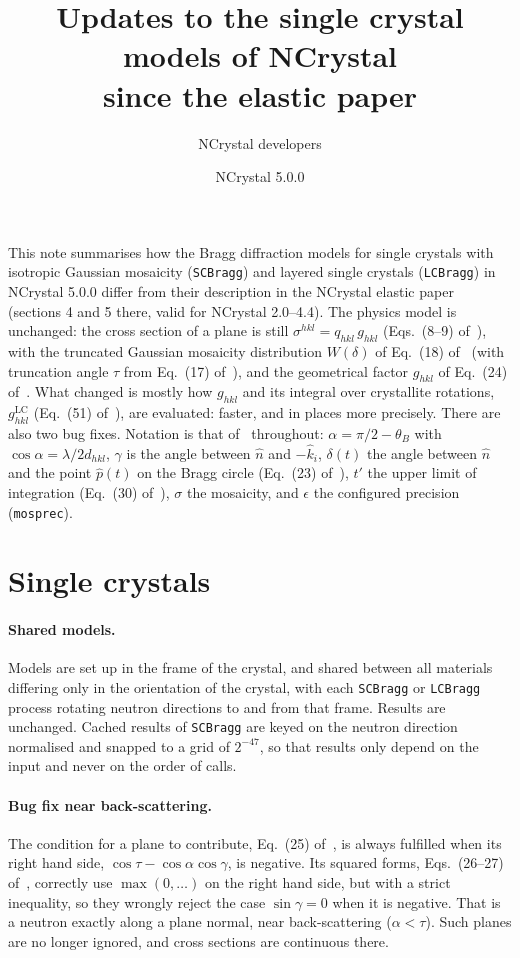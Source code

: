 \documentclass[11pt,a4paper]{article}
\title{Updates to the single crystal models of NCrystal\\
  since the elastic paper}
\author{NCrystal developers}
\date{NCrystal 5.0.0}
\newcommand{\Eq}[1]{Eq.~(#1) of~\cite{elastic}}
\newcommand{\Eqs}[1]{Eqs.~(#1) of~\cite{elastic}}
\begin{document}
\maketitle

\noindent This note summarises how the Bragg diffraction models for single
crystals with isotropic Gaussian mosaicity (\texttt{SCBragg}) and layered
single crystals (\texttt{LCBragg}) in NCrystal 5.0.0 differ from their
description in the NCrystal elastic paper~\cite{elastic} (sections 4 and 5
there, valid for NCrystal 2.0--4.4). The physics model is unchanged: the
cross section of a plane is still $\sigma^{hkl} = q_{hkl}\,g_{hkl}$
(\Eqs{8--9}), with the truncated Gaussian mosaicity distribution $W(\delta)$
of \Eq{18} (with truncation angle $\tau$ from \Eq{17}), and the geometrical
factor $g_{hkl}$ of \Eq{24}. What changed is mostly how $g_{hkl}$ and its
integral over crystallite rotations, $g^\text{LC}_{hkl}$ (\Eq{51}), are
evaluated: faster, and in places more precisely. There are also two bug
fixes.
Notation is that of~\cite{elastic} throughout: $\alpha = \pi/2-\theta_B$ with
$\cos\alpha = \lambda/2d_{hkl}$, $\gamma$ is the angle between $\hat n$ and
$-\hat k_i$, $\delta(t)$ the angle between $\hat n$ and the point $\hat p(t)$
on the Bragg circle (\Eq{23}), $t'$ the upper limit of integration (\Eq{30}),
$\sigma$ the mosaicity, and $\epsilon$ the configured precision
(\texttt{mosprec}).

\section{Single crystals}\label{sec:single}

\paragraph{Shared models.} Models are set up in the frame of the crystal, and
shared between all materials differing only in the orientation of the
crystal, with each \texttt{SCBragg} or \texttt{LCBragg} process rotating
neutron directions to and from that frame. Results are unchanged. Cached
results of \texttt{SCBragg} are keyed on the neutron direction normalised and
snapped to a grid of $2^{-47}$, so that results only depend on the input and
never on the order of calls.

\paragraph{Bug fix near back-scattering.} The condition for a plane to
contribute, \Eq{25}, is always fulfilled when its right hand side,
$\cos\tau-\cos\alpha\cos\gamma$, is negative. Its squared forms,
\Eqs{26--27}, correctly use $\max(0,\ldots)$ on the right hand side, but with
a strict inequality, so they wrongly reject the case $\sin\gamma = 0$ when it
is negative. That is a neutron exactly along a plane normal, near
back-scattering ($\alpha < \tau$). Such planes are no longer ignored, and
cross sections are continuous there.
\end{document}
